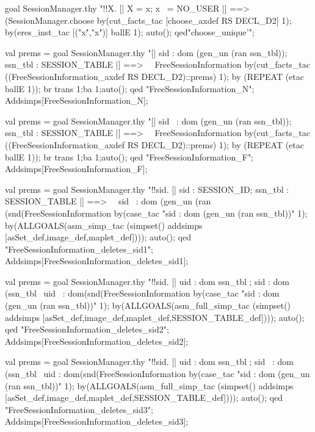 \documentclass[a4paper,pdftex]{article}
\newenvironment{holz-proof}{\comment}{\endcomment}
\begin{document}
\begin{holz-proof}
goal SessionManager.thy 
"!!X.  [| X = {x}; x ~= NO_USER |] ==> (SessionManager.choose %
by(cut_facts_tac [choose_axdef RS DECL_D2] 1); 
by(eres_inst_tac [("x","{x}")] ballE 1);
auto();
qed"choose_unique'";



val prems = goal SessionManager.thy 
"[| sid : dom (gen_un (ran ssn_tbl)); ssn_tbl : SESSION_TABLE |] ==>             \
\ FreeSessionInformation %
by(cut_facts_tac ((FreeSessionInformation_axdef RS DECL_D2)::prems) 1);
by (REPEAT (etac ballE 1));
br trans 1;ba 1;auto();
qed "FreeSessionInformation_N";
Addsimps[FreeSessionInformation_N];


val prems = goal SessionManager.thy 
"[| sid ~: dom (gen_un (ran ssn_tbl)); ssn_tbl : SESSION_TABLE |] ==>   \
\ FreeSessionInformation %
by(cut_facts_tac ((FreeSessionInformation_axdef RS DECL_D2)::prems) 1);
by (REPEAT (etac ballE 1));
br trans 1;ba 1;auto();
qed "FreeSessionInformation_F";
Addsimps[FreeSessionInformation_F];



val prems = goal SessionManager.thy 
"!!sid. [| sid : SESSION_ID; ssn_tbl : SESSION_TABLE |] ==>             \
\ sid ~: dom (gen_un (ran (snd(FreeSessionInformation %
by(case_tac "sid : dom (gen_un (ran ssn_tbl))" 1);
by(ALLGOALS(asm_simp_tac (simpset() addsimps 
                          [asSet_def,image_def,maplet_def])));
auto();
qed "FreeSessionInformation_deletes_sid1";
Addsimps[FreeSessionInformation_deletes_sid1];



val prems = goal SessionManager.thy 
"!!sid. [| uid : dom ssn_tbl ; sid : dom (ssn_tbl %
\   uid ~: dom(snd(FreeSessionInformation %
by(case_tac "sid : dom (gen_un (ran ssn_tbl))" 1);
by(ALLGOALS(asm_full_simp_tac (simpset() addsimps 
                          [asSet_def,image_def,maplet_def,SESSION_TABLE_def])));
auto();
qed "FreeSessionInformation_deletes_sid2";
Addsimps[FreeSessionInformation_deletes_sid2];

val prems = goal SessionManager.thy 
"!!sid. [| uid : dom ssn_tbl ; sid ~: dom (ssn_tbl %
\   uid : dom(snd(FreeSessionInformation %
by(case_tac "sid : dom (gen_un (ran ssn_tbl))" 1);
by(ALLGOALS(asm_full_simp_tac (simpset() addsimps 
                          [asSet_def,image_def,maplet_def,SESSION_TABLE_def])));
auto();
qed "FreeSessionInformation_deletes_sid3";
Addsimps[FreeSessionInformation_deletes_sid3];


\end{holz-proof}
\end{document}
